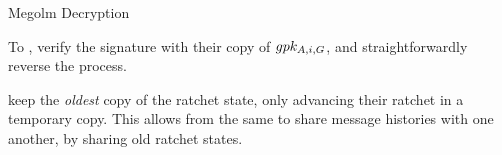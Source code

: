\documentclass[aspectratio=169]{beamer}
\begin{document}
\begin{frame}{Megolm Decryption}
  \begin{multicols}{2}
    To ,  verify the signature with their copy of $\MegolmPK[A,i,G]$, and straightforwardly reverse the process.

     keep the \emph{oldest} copy of the ratchet state, only advancing their ratchet in a temporary copy. This allows  from the same  to share message histories with one another, by sharing old ratchet states.
\end{multicols}\end{frame}
\end{document}
